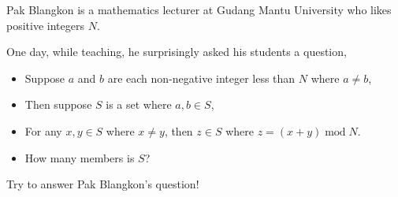 Pak Blangkon is a mathematics lecturer at Gudang Mantu University who likes positive integers $N$.

One day, while teaching, he surprisingly asked his students a question,
\begin{itemize}
\item Suppose $a$ and $b$ are each non-negative integer less than $N$ where $a \neq b$,
\item Then suppose $S$ is a set where $a,b\in{S}$,
\item For any $x,y \in S$ where $x \neq y$, then $z\in S$ where $z=(x+y)\operatorname{mod}N$.
\item How many members is $S$?
\end{itemize}

Try to answer Pak Blangkon's question!
